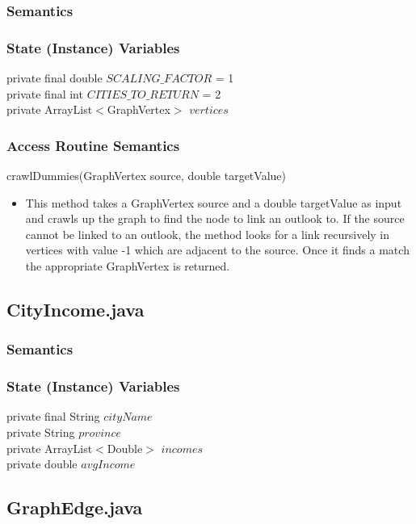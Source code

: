 \documentclass[12pt,fleqn]{article}
\begin{document}
\subsubsection*{Semantics}

\subsubsection*{State (Instance) Variables}
	private final double $SCALING\_FACTOR$ = 1\\
	private final int $CITIES\_TO\_RETURN$ = 2\\
	private ArrayList$<$GraphVertex$>$ $vertices$

\subsubsection*{Access Routine Semantics}

\noindent crawlDummies(GraphVertex source, double targetValue)
\begin{itemize}
\item This method takes a GraphVertex source and a double targetValue as input and crawls up the graph to find the node to link an outlook to. If the source cannot be linked to an outlook, the method looks for a link recursively in vertices with value -1 which are adjacent to the source. Once it finds a match the appropriate GraphVertex is returned.
\end{itemize}

\subsection*{CityIncome.java}\label{pcityincome}

\subsubsection*{Semantics}
\subsubsection*{State (Instance) Variables}
	private final String $cityName$\\
	private String $province$\\
	private ArrayList$<$Double$>$ $incomes$\\
	private double $avgIncome$\\


\subsection*{GraphEdge.java}\label{pedge}
\end{document}
